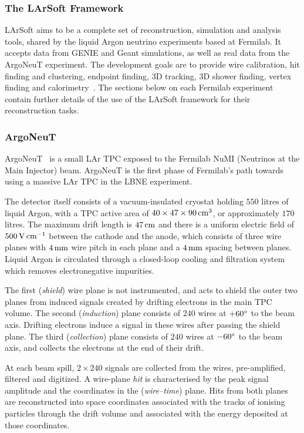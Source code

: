 \subsubsection{The LArSoft Framework}
LArSoft aims to be a complete set of reconstruction, simulation and analysis tools, shared by the liquid Argon neutrino experiments based at Fermilab. It accepts data from GENIE and Geant simulations, as well as real data from the ArgoNeuT experiment. The development goals are to provide wire calibration, hit finding and clustering, endpoint finding, 3D tracking, 3D shower finding, vertex finding and calorimetry~\citep{LArSoft2011}. The sections below on each Fermilab experiment contain further details of the use of the LArSoft framework for their reconstruction tasks.

\subsubsection{ArgoNeuT}
ArgoNeuT~\citep{ArgoNeuT} is a small \acs{LAr TPC} exposed to the Fermilab NuMI (Neutrinos at the Main Injector) beam. ArgoNeuT is the first phase of Fermilab's path towards using a massive \acs{LAr TPC} in the LBNE experiment.

The detector itself consists of a vacuum-insulated cryostat holding $550$ litres of liquid Argon, with a \acs{TPC} active area of $40\times47\times90\,\mathrm{cm}^3$, or approximately $170$ litres. The maximum drift length is $47\,\mathrm{cm}$ and there is a uniform electric field of $500\,\mathrm{V}\,\mathrm{cm}^{-1}$ between the cathode and the anode, which consists of three wire planes with $4\,\mathrm{mm}$ wire pitch in each plane and a $4\,\mathrm{mm}$ spacing between planes. Liquid Argon is circulated through a closed-loop cooling and filtration system which removes electronegative impurities.

The first (\emph{shield}) wire plane is not instrumented, and acts to shield the outer two planes from induced signals created by drifting electrons in the main \acs{TPC} volume. The second (\emph{induction}) plane consists of $240$ wires at $+60^\circ$ to the beam axis. Drifting electrons induce a signal in these wires after passing the shield plane. The third (\emph{collection}) plane consists of $240$ wires at $-60^\circ$ to the beam axis, and collects the electrons at the end of their drift.

At each beam spill, $2\times240$ signals are collected from the wires, pre-amplified, filtered and digitized. A wire-plane \emph{hit} is characterised by the peak signal amplitude and the coordinates in the (\emph{wire--time}) plane. Hits from both planes are reconstructed into space coordinates associated with the tracks of ionising particles through the drift volume and associated with the energy deposited at those coordinates.

